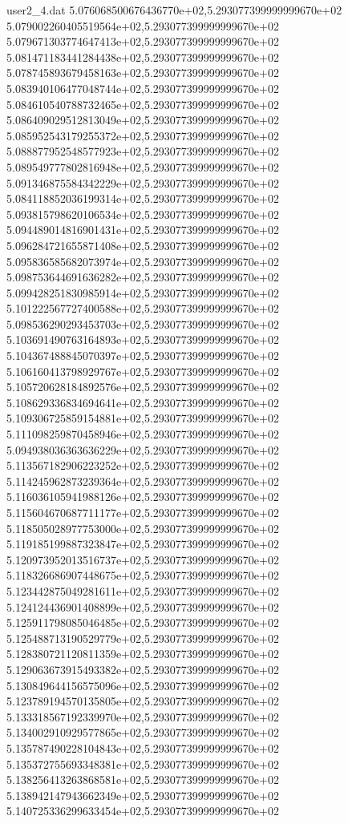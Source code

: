 \begin{filecontents}{user2_4.dat}
5.076068500676436770e+02,5.293077399999999670e+02
5.079002260405519564e+02,5.293077399999999670e+02
5.079671303774647413e+02,5.293077399999999670e+02
5.081471183441284438e+02,5.293077399999999670e+02
5.078745893679458163e+02,5.293077399999999670e+02
5.083940106477048744e+02,5.293077399999999670e+02
5.084610540788732465e+02,5.293077399999999670e+02
5.086409029512813049e+02,5.293077399999999670e+02
5.085952543179255372e+02,5.293077399999999670e+02
5.088877952548577923e+02,5.293077399999999670e+02
5.089549777802816948e+02,5.293077399999999670e+02
5.091346875584342229e+02,5.293077399999999670e+02
5.084118852036199314e+02,5.293077399999999670e+02
5.093815798620106534e+02,5.293077399999999670e+02
5.094489014816901431e+02,5.293077399999999670e+02
5.096284721655871408e+02,5.293077399999999670e+02
5.095836585682073974e+02,5.293077399999999670e+02
5.098753644691636282e+02,5.293077399999999670e+02
5.099428251830985914e+02,5.293077399999999670e+02
5.101222567727400588e+02,5.293077399999999670e+02
5.098536290293453703e+02,5.293077399999999670e+02
5.103691490763164893e+02,5.293077399999999670e+02
5.104367488845070397e+02,5.293077399999999670e+02
5.106160413798929767e+02,5.293077399999999670e+02
5.105720628184892576e+02,5.293077399999999670e+02
5.108629336834694641e+02,5.293077399999999670e+02
5.109306725859154881e+02,5.293077399999999670e+02
5.111098259870458946e+02,5.293077399999999670e+02
5.094938036363636229e+02,5.293077399999999670e+02
5.113567182906223252e+02,5.293077399999999670e+02
5.114245962873239364e+02,5.293077399999999670e+02
5.116036105941988126e+02,5.293077399999999670e+02
5.115604670687711177e+02,5.293077399999999670e+02
5.118505028977753000e+02,5.293077399999999670e+02
5.119185199887323847e+02,5.293077399999999670e+02
5.120973952013516737e+02,5.293077399999999670e+02
5.118326686907448675e+02,5.293077399999999670e+02
5.123442875049281611e+02,5.293077399999999670e+02
5.124124436901408899e+02,5.293077399999999670e+02
5.125911798085046485e+02,5.293077399999999670e+02
5.125488713190529779e+02,5.293077399999999670e+02
5.128380721120811359e+02,5.293077399999999670e+02
5.129063673915493382e+02,5.293077399999999670e+02
5.130849644156575096e+02,5.293077399999999670e+02
5.123789194570135805e+02,5.293077399999999670e+02
5.133318567192339970e+02,5.293077399999999670e+02
5.134002910929577865e+02,5.293077399999999670e+02
5.135787490228104843e+02,5.293077399999999670e+02
5.135372755693348381e+02,5.293077399999999670e+02
5.138256413263868581e+02,5.293077399999999670e+02
5.138942147943662349e+02,5.293077399999999670e+02
5.140725336299633454e+02,5.293077399999999670e+02

\end{filecontents}
